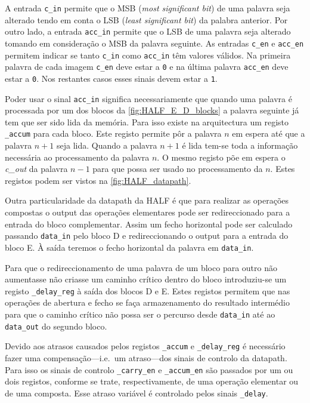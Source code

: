 \documentclass[a4paper]{article}
\begin{document}
A entrada \texttt{c\_in} permite que o MSB (\textit{most significant bit}) de uma palavra seja alterado tendo em conta o LSB (\textit{least significant bit}) da palabra anterior. Por outro lado, a entrada \texttt{acc\_in} permite que o LSB de uma palavra seja alterado tomando em consideração o MSB da palavra seguinte. As entradas \texttt{c\_en} e \texttt{acc\_en} permitem indicar se tanto \texttt{c\_in} como \texttt{acc\_in} têm valores válidos. Na primeira palavra de cada imagem \texttt{c\_en} deve estar a \texttt{0} e na última palavra \texttt{acc\_en} deve estar a \texttt{0}. Nos restantes casos esses sinais devem estar a \texttt{1}.

Poder usar o sinal \texttt{acc\_in} significa necessariamente que quando uma palavra é processada por um dos blocos da \autoref{fig:HALF_E_D_blocks} a palavra seguinte já tem que ser sido lida da memória. Para isso existe na arquitectura um registo \texttt{\_accum} para cada bloco. Este registo permite pôr a palavra $n$ em espera até que a palavra $n+1$ seja lida. Quando a palavra $n+1$ é lida tem-se toda a informação necessária ao processamento da palavra $n$. O mesmo registo põe em espera o \textit{c\_out} da palavra $n-1$ para que possa ser usado no processamento da $n$. Estes registos podem ser vistos na \autoref{fig:HALF_datapath}.

Outra particularidade da datapath da HALF é que para realizar as operações compostas o output das operações elementares pode ser redireccionado para a entrada do bloco complementar. Assim um fecho horizontal pode ser calculado passando \texttt{data\_in} pelo bloco D e redireccionando o output para a entrada do bloco E. À saída teremos o fecho horizontal da palavra em \texttt{data\_in}.

Para que o redireccionamento de uma palavra de um bloco para outro não aumentasse não criasse um caminho crítico dentro do bloco introduziu-se um registo \texttt{\_delay\_reg} à saída dos blocos D e E. Estes registos permitem que nas operações de abertura e fecho se faça armazenamento do resultado intermédio para que o caminho crítico não possa ser o percurso desde \texttt{data\_in} até ao \texttt{data\_out} do segundo bloco.

Devido aos atrasos causados pelos registos \texttt{\_accum} e \texttt{\_delay\_reg} é necessário fazer uma compensação---i.e.\ um atraso---dos sinais de controlo da datapath. Para isso os sinais de controlo \texttt{\_carry\_en} e \texttt{\_accum\_en} são passados por um ou dois registos, conforme se trate, respectivamente, de uma operação elementar ou de uma composta. Esse atraso variável é controlado pelos sinais \texttt{\_delay}.
\end{document}
